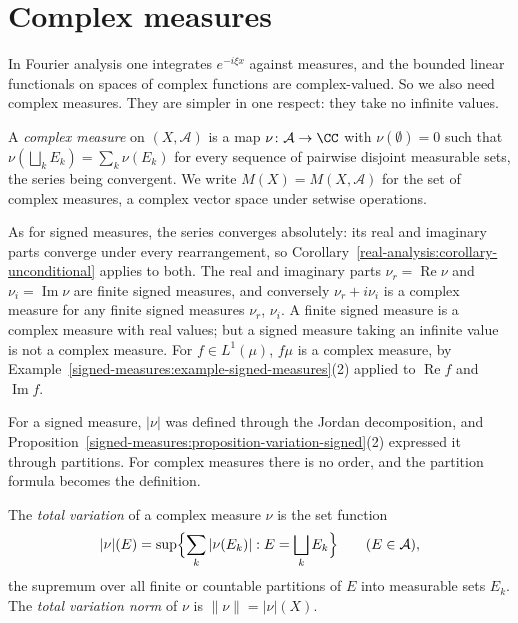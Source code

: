\section{Complex measures}\label{signed-measures:section-complex}

In Fourier analysis one integrates $e^{-i\xi x}$ against measures, and the bounded linear functionals on spaces of complex functions are complex-valued. So we also need complex measures. They are
simpler in one respect: they take no infinite values.

\begin{definition}\label{signed-measures:definition-complex-measure}
A \emph{complex measure} on $(X, \mathcal{A})$ is a map $\nu \colon \mathcal{A} \to \CC$ with $\nu(\emptyset) = 0$ such that $\nu(\bigsqcup_kE_k) = \sum_k\nu(E_k)$ for every sequence of
pairwise disjoint measurable sets, the series being convergent. We write $M(X) = M(X, \mathcal{A})$ for the set of complex measures, a complex vector space under setwise operations.
\end{definition}

As for signed measures, the series converges absolutely: its real and imaginary parts converge under every rearrangement, so Corollary~\ref{real-analysis:corollary-unconditional} applies to both.
The real and imaginary parts $\nu_r = \operatorname{Re}\nu$ and $\nu_i = \operatorname{Im}\nu$ are finite signed measures, and conversely $\nu_r + i\nu_i$ is a complex measure for any finite signed
measures $\nu_r$, $\nu_i$. A finite signed measure is a complex measure with real values; but a signed measure taking an infinite value is not a complex measure. For $f \in L^1(\mu)$, $f\mu$ is a
complex measure, by Example~\ref{signed-measures:example-signed-measures}(2) applied to $\operatorname{Re}f$ and $\operatorname{Im}f$.

For a signed measure, $|\nu|$ was defined through the Jordan decomposition, and Proposition~\ref{signed-measures:proposition-variation-signed}(2) expressed it through partitions. For complex
measures there is no order, and the partition formula becomes the definition.

\begin{definition}\label{signed-measures:definition-total-variation}
The \emph{total variation} of a complex measure $\nu$ is the set function
\[
|\nu|(E) = \sup\Bigl\{\sum_k|\nu(E_k)| : E = \bigsqcup_kE_k\Bigr\} \qquad (E \in \mathcal{A}),
\]
the supremum over all finite or countable partitions of $E$ into measurable sets $E_k$.
The \emph{total variation norm} of $\nu$ is $\|\nu\| = |\nu|(X)$.
\end{definition}

